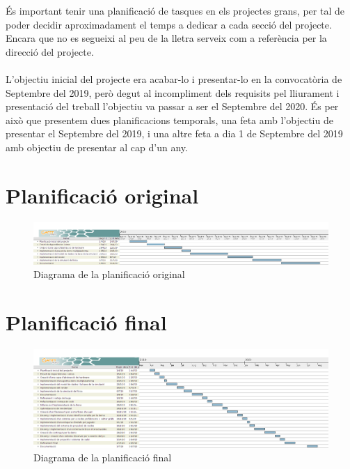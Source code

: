 És important tenir una planificació de tasques en els projectes grans, per tal de poder decidir aproximadament el temps a dedicar a cada secció del projecte.
Encara que no es segueixi al peu de la lletra serveix com a referència per la direcció del projecte.
\\ \\
L'objectiu inicial del projecte era acabar-lo i presentar-lo en la convocatòria de Septembre del 2019, però degut al incompliment dels requisits pel lliurament i presentació del treball l'objectiu va passar a ser el Septembre del 2020.
És per això que presentem dues planificacions temporals, una feta amb l'objectiu de presentar el Septembre del 2019, i una altre feta a dia 1 de Septembre del 2019 amb objectiu de presentar al cap d'un any.

\section{Planificació original}

\begin{figure}[H]
  \centering
  \includegraphics[angle=90,origin=c,scale=0.35]{img/planificacioOG}
  \caption{Diagrama de la planificació original}
\end{figure}
\section{Planificació final}
\begin{figure}[H]
  \centering
  \includegraphics[angle=90,origin=c,scale=0.4]{img/novaPlanificacio}
  \caption{Diagrama de la planificació final}
\end{figure}

